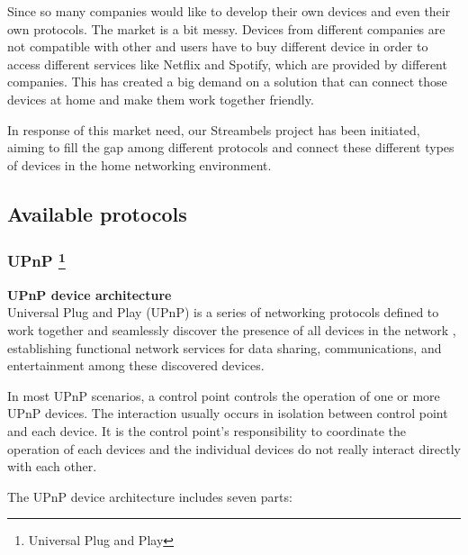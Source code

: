 Since so many companies would like to develop their own devices and even their 
own protocols. The market is a bit messy. Devices from different companies are not compatible with other and users have to buy different device in order to access different services like Netflix and Spotify, which are provided by different companies.  This has created a big demand on a solution that can connect those devices at home and make them work together friendly. 

In response of this market need, our Streambels project has been initiated, aiming to fill the gap among different protocols and connect these different types of devices in the home networking environment. 

\subsection{Available protocols} 
\subsubsection[UPnP]{UPnP \footnote{Universal Plug and Play}}
\textbf{UPnP device architecture}\\ 
Universal Plug and Play (UPnP) is a series of networking protocols defined to 
work together and seamlessly discover the presence of all devices in the network 
, establishing functional network services for data sharing, communications, and 
entertainment among these discovered devices. 

In most UPnP scenarios, a control point controls the operation of one or more 
UPnP devices. The interaction usually occurs in isolation between control point 
and each device. It is the control point's responsibility to coordinate the operation of 
each devices and the individual devices do not really interact directly with each other. 

The UPnP device architecture \cite{upnp} \label{upnp} \label{upnpdevice} 
includes seven parts: 
 
